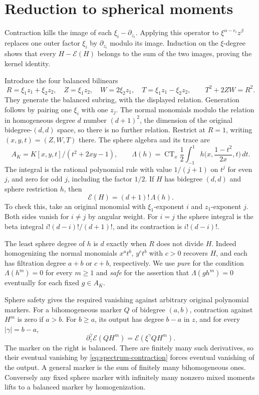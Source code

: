 \section{Reduction to spherical moments}\label{sec:sphere}

Contraction kills the image of each \(\xi_i-\partial_{z_i}\). Applying
this operator to \(\xi^{\alpha-e_i}z^\beta\) replaces one outer factor
\(\xi_i\) by \(\partial_{z_i}\) modulo its image. Induction on the
\(\xi\)-degree shows that every \(H-\mathcal E(H)\) belongs to the sum
of the two images, proving the kernel identity.

Introduce the four balanced bilinears
\[
 R=\xi_1z_1+\xi_2z_2,\quad Z=\xi_1z_2,\quad
 W=2\xi_2z_1,\quad T=\xi_1z_1-\xi_2z_2,
 \qquad T^2+2ZW=R^2.
\]
They generate the balanced subring, with the displayed relation.
Generation follows by pairing one \(\xi_i\) with one \(z_j\). The normal
monomials modulo the relation in homogeneous degree \(d\) number
\((d+1)^2\), the dimension of the original bidegree-\((d,d)\) space,
so there is no further relation. Restrict at \(R=1\), writing
\((x,y,t)=(Z,W,T)\) there. The sphere algebra and its trace are
\[
 A_K=K[x,y,t]/(t^2+2xy-1),\qquad
 \Lambda(h)=\operatorname{CT}_x\frac12\int_{-1}^1
    h\biggl(x,\frac{1-t^2}{2x},t\biggr)\,dt.
\]
The integral is the rational polynomial rule with value \(1/(j+1)\)
on \(t^j\) for even \(j\), and zero for odd \(j\), including the factor
\(1/2\). If \(H\) has bidegree \((d,d)\) and sphere restriction \(h\), then
\begin{equation}\label{eq:spectrum-contraction}
 \mathcal E(H)=(d+1)!\,\Lambda(h).
\end{equation}
To check this, take an original monomial with \(\xi_1\)-exponent \(i\)
and \(z_1\)-exponent \(j\). Both sides vanish for \(i\ne j\) by angular
weight. For \(i=j\) the sphere integral is the beta integral
\(i!(d-i)!/(d+1)!\), and its contraction is \(i!(d-i)!\).

The least sphere degree of \(h\) is \(d\) exactly when \(R\) does not
divide \(H\). Indeed homogenizing the normal monomials \(x^at^b\),
\(y^ct^b\) with \(c>0\) recovers \(H\), and each has filtration degree
\(a+b\) or \(c+b\), respectively. We use \emph{pure} for the condition
\(\Lambda(h^m)=0\) for every \(m\geq 1\) and \emph{safe} for the assertion
that \(\Lambda(gh^m)=0\) eventually for each fixed \(g\in A_K\).

Sphere safety gives the required vanishing against arbitrary original
polynomial markers. For a bihomogeneous marker \(Q\) of bidegree
\((a,b)\), contraction against \(H^m\) is zero if \(a>b\). For \(b\ge a\),
its output has degree \(b-a\) in \(z\), and for every \(|\gamma|=b-a\),
\[
 \partial_z^\gamma\mathcal E(QH^m)
   =\mathcal E(\xi^\gamma QH^m).
\]
The marker on the right is balanced. There are finitely many such
derivatives, so their eventual vanishing by
\eqref{eq:spectrum-contraction} forces eventual vanishing of the
output. A general marker is the sum of finitely many bihomogeneous
ones. Conversely any fixed sphere marker with infinitely many nonzero
mixed moments lifts to a balanced marker by homogenization.

